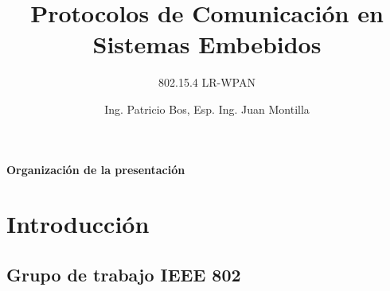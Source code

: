 \documentclass[aspectratio=169]{beamer}
\title[802.15.4 LR-WPAN]{Protocolos de Comunicación en Sistemas Embebidos}
\subtitle{802.15.4 LR-WPAN}
\author[]{Ing. Patricio Bos, Esp. Ing. Juan Montilla}
\institute[CESE-FIUBA]{Carrera de Especialización en Sistemas Embebidos - FIUBA}
\date{}
\begin{document}
\begingroup
\makeatletter
\setlength{\hoffset}{-.5\beamer@sidebarwidth}
\makeatother
\begin{frame}
  \titlepage
\end{frame}

\endgroup



\begin{frame}{\textbf{Organización de la presentación}}
  \tableofcontents
\end{frame}
%
%

\section{Introducción}

\subsection[IEEE 802]{Grupo de trabajo IEEE 802}
\end{document}
